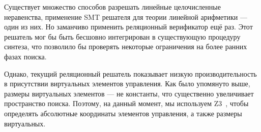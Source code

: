 


Существует множество способов разрешать линейные целочисленные неравенства, применение SMT решателя для теории линейной арифметики --- один из них.
Но заманчиво применить реляционный верификатор ещё раз. Этот решатель   мог бы быть бесшовно интегрирован в существующую процедуру синтеза, что
позволило бы проверять некоторые ограничения на более ранних фазах поиска.


Однако, текущий реляционный решатель показывает низкую производительность в присутствии виртуальных элементов управления.
Как было упомянуто выше, размеры виртуальных элементов --- не константы, что существенно увеличивает пространство поиска.
Поэтому, на данный момент, мы используем \textsc{Z3}~\cite{Zthree}, чтобы определять абсолютные координаты элементов управления,
а также размеры виртуальных.


